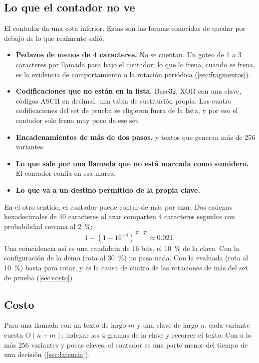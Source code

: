 \subsection{Lo que el contador no ve}\label{sec:contador-limites}

El contador da una cota inferior. Estas son las formas conocidas de quedar por debajo de lo que
realmente salió.

\begin{itemize}
  \item \textbf{Pedazos de menos de 4 caracteres.} No se cuentan. Un goteo de 1 a 3 caracteres por
    llamada pasa bajo el contador; lo que lo frena, cuando se frena, es la evidencia de
    comportamiento o la rotación periódica (\cref{sec:fragmentos}).
  \item \textbf{Codificaciones que no están en la lista.} Base32, XOR con una clave, códigos ASCII en
    decimal, una tabla de sustitución propia. Las cuatro codificaciones del set de prueba se
    eligieron fuera de la lista, y por eso el contador solo frena muy poco de ese set.
  \item \textbf{Encadenamientos de más de dos pasos,} y textos que generan más de 256 variantes.
  \item \textbf{Lo que sale por una llamada que no está marcada como sumidero.} El contador confía en
    esa marca.
  \item \textbf{Lo que va a un destino permitido de la propia clave.}
\end{itemize}

En el otro sentido, el contador puede contar de más por azar. Dos cadenas hexadecimales de 40
caracteres al azar comparten 4 caracteres seguidos con probabilidad cercana al \qty{2}{\percent}:
\[
  1 - \left(1 - 16^{-4}\right)^{37 \cdot 37} \approx \num{0.021} .
\]
Una coincidencia así es una candidata de 16 bits, el \qty{10}{\percent} de la clave. Con la
configuración de la demo (rota al \qty{30}{\percent}) no pasa nada. Con la evaluada (rota al
\qty{10}{\percent}) basta para rotar, y es la causa de cuatro de las rotaciones de más del set de
prueba (\cref{sec:costo}).

\subsection{Costo}

Para una llamada con un texto de largo $m$ y una clave de largo $n$, cada variante cuesta $O(n + m)$:
indexar los 4-gramas de la clave y recorrer el texto. Con a lo más 256 variantes y pocas claves, el
contador es una parte menor del tiempo de una decisión (\cref{sec:latencia}).
